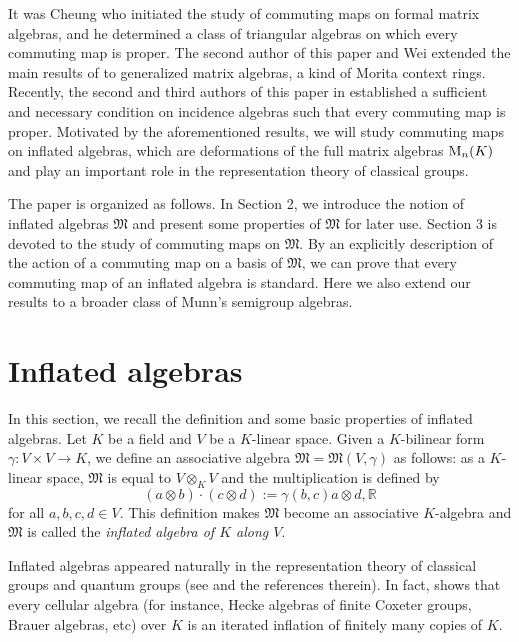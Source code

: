 \documentclass[reqno]{amsart}
\theoremstyle{plain}
\theoremstyle{definition}
\begin{document}
It was Cheung \cite{Cheung} who initiated the study of commuting maps on formal matrix algebras, and
he determined a class of triangular algebras on which every commuting map is proper. 
The second author of this paper and Wei \cite{XiaoWei} extended
the main results of \cite{Cheung} to
generalized matrix algebras, a kind of Morita context rings.
Recently, the second and third authors of this paper in \cite{JX} established a sufficient and necessary condition on
incidence algebras such that every commuting map is proper.
Motivated by the aforementioned results, we will
study commuting maps on inflated algebras, which are deformations of the full matrix algebras ${\rm M}_n(K)$ and
play an important role in the representation theory of classical groups.


The paper is organized as follows. In Section 2, we introduce the notion of inflated algebras $\mathfrak{M}$ and present some properties of $\mathfrak{M}$ for later use. Section 3 is devoted to the study of commuting maps on $\mathfrak{M}$. By an explicitly description of the action of a commuting map on a basis of $\mathfrak{M}$, we can prove that every commuting map of an inflated algebra is standard. Here we also extend our results to a broader class of Munn's semigroup algebras.

 
\section{Inflated algebras}\label{xxsec2}

In this section, we recall the definition and some basic properties of inflated algebras.
Let $K$ be a field and $V$ be a $K$-linear space.
Given a $K$-bilinear form $\gamma: V \times V \to K$,
we define an associative algebra  $\mathfrak{M}=\mathfrak{M}(V, \gamma)$ as follows:
as a $K$-linear space, $\mathfrak{M}$ is equal to $V \otimes_K V$ and the multiplication is defined by
$$
(a \otimes b) \cdot (c \otimes d) := \gamma (b, c) a\otimes d, \mathds{R} 
$$
for all $ a, b, c, d \in V $.
This definition makes $\mathfrak{M}$ become an associative $K$-algebra and $\mathfrak{M}$ is called the \textit{inflated algebra of $K$ along $V$}.

Inflated algebras appeared naturally in the representation theory of classical groups and quantum groups (see \cite{xi1} and the references therein).
In fact, \cite[Theorem 4.1]{xi1} shows that every cellular algebra (for instance, Hecke algebras of finite Coxeter groups, Brauer algebras, etc) 
over $K$ is an iterated inflation of finitely many copies of $K$.
\end{document}
